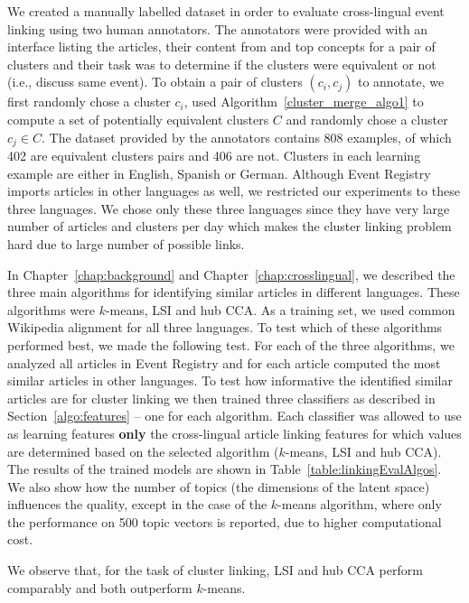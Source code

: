 We created a manually labelled dataset in order to evaluate cross-lingual event 
linking using two human annotators. The annotators were provided with an interface 
listing the articles, their content from and top concepts for a pair of clusters and 
their task was to determine if the clusters were equivalent or not (i.e., discuss same event). 
To obtain a pair of clusters $(c_i, c_j)$ to annotate, we first randomly chose a 
cluster $c_i$, used Algorithm~\ref{cluster_merge_algo1} to compute a set of potentially 
equivalent clusters $C$ and randomly chose a cluster $c_j \in C$. The dataset provided 
by the annotators contains 808 examples, of which 402 are equivalent clusters pairs and 
406 are not. Clusters in each learning example are either in English, Spanish or German. 
Although Event Registry imports articles in other languages as well, we restricted our 
experiments to these three languages. We chose only these three languages since they 
have very large number of articles and clusters per day which makes the cluster linking 
problem hard due to large number of possible links.

In Chapter~\ref{chap:background} and Chapter~\ref{chap:crosslingual}, we described the 
three main algorithms for identifying similar articles in different languages. 
These algorithms were $k$-means, LSI and hub CCA. As a training set, we used common 
Wikipedia alignment for all three languages. To test 
which of these algorithms performed best, we made the following test. For each of the three 
algorithms, we analyzed all articles in Event Registry and for each article computed the 
most similar articles in other languages. To test how informative the identified similar 
articles are for cluster linking we then trained three classifiers as described in 
Section~\ref{algo:features} -- one for each algorithm. Each classifier was allowed 
to use as learning features \textbf{only} the cross-lingual article linking features 
for which values are determined based on the selected algorithm ($k$-means, LSI and hub CCA). 
The results of the trained models are shown in Table~\ref{table:linkingEvalAlgos}. We also show 
how the number of topics (the dimensions of the latent space) influences the quality, 
except in the case of the $k$-means algorithm, where only the performance on 500 topic 
vectors is reported, due to higher computational cost.

We observe that, for the task of cluster linking, LSI and hub CCA perform comparably and both outperform $k$-means.


